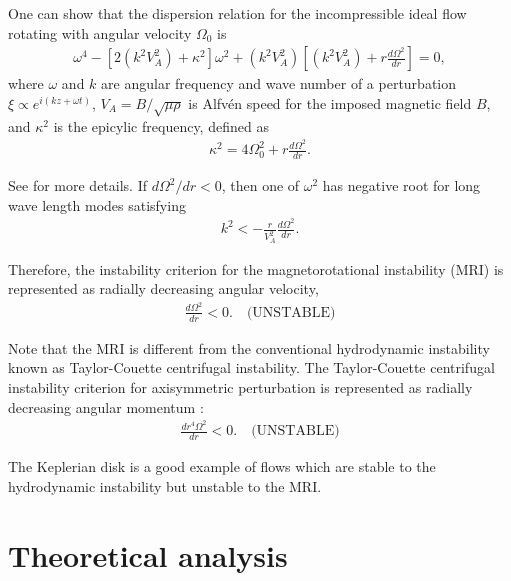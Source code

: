 \documentclass{jfm}
\begin{document}
One can show that the dispersion relation for the incompressible ideal flow 
rotating with angular velocity $\Omega_0$ is
\begin{align}
    \omega^4-\left[2\left(k^2 V_A^2\right) +\kappa^2\right]\omega^2 +\left(k^2 V_A^2\right)\left[\left(k^2 V_A^2\right)+r\frac{d \Omega^2}{dr}\right]=0 ,
\end{align}
where $\omega$ and $k$ are angular frequency and wave number of a perturbation
$\xi \propto e^{i(k z+\omega t)}$, $V_A = B / \sqrt{\mu \rho}$ is Alfv\'en speed
for the imposed magnetic field $B$, and $\kappa^2$ is the epicylic frequency, 
defined as
\begin{align}
    \kappa^2=4\Omega_0^2 + r \frac{d \Omega^2}{dr} .
\end{align}

See \cite{Balbus1991, Balbus1998, Balbus2003} for more details. If 
$d \Omega^2 / dr < 0$, then one of $\omega^2$ has negative root for long wave 
length modes satisfying
\begin{align}
    k^2 < -\frac{r}{V_A^2}\frac{d\Omega^2}{dr} .
\end{align}

Therefore, the instability criterion for the magnetorotational instability (MRI)
is represented as radially decreasing angular velocity,
\begin{align}
    \frac{d \Omega^2}{dr} < 0 . \quad \text{(UNSTABLE)}
\end{align} 

Note that the MRI is different from the conventional hydrodynamic instability 
known as Taylor-Couette centrifugal instability. The Taylor-Couette centrifugal
instability criterion for axisymmetric perturbation is represented as radially 
decreasing angular momentum \citep{Charru2011}:
\begin{align}
    \frac{d r^4 \Omega^2}{dr} < 0 . \quad \text{(UNSTABLE)}
\end{align}

The Keplerian disk is a good example of flows which are stable to the 
hydrodynamic instability but unstable to the MRI.



\section{Theoretical analysis}
\label{sec:theory}
\end{document}
